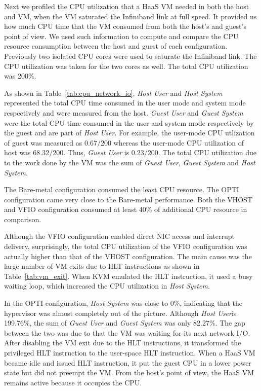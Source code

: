 Next we profiled the CPU utilization that a HaaS VM needed in
both the host and VM, when the VM saturated the Infiniband
link at full speed. It provided us how much CPU time that the
VM consumed from both the host's and guest's point of view. We
used such information to compute and compare the CPU resource
consumption between the host and guest of each configuration.
Previously two isolated CPU cores were used to saturate the
Infiniband link. The CPU utilization was taken for the two
cores as well. The total CPU utilization was 200\%.

As shown in Table~\ref{tab:cpu_network_io}, \emph{Host
User} and \emph{Host System} represented the total CPU time
consumed in the user mode and system mode respectively and
were measured from the host. \emph{Guest User} and \emph{Guest
System} were the total CPU time consumed in the user and
system mode respectively by the guest and are part of
\emph{Host User}. For example, the user-mode CPU utlization of
guest was measured as $0.67/200$ whereas the user-mode CPU
utilization of host was $68.32/200$. Thus, \emph{Guest User}
is $0.23/200$. The total CPU utilization due to the work done
by the VM was the sum of \emph{Guest User}, \emph{Guest
System} and \emph{Host System}.

The Bare-metal configuration consumed the least CPU resource.
The OPTI configuration came very close to the Bare-metal
performance. Both the VHOST and VFIO configuration consumed at
least 40\% of additional CPU resource in comparison.

Although the VFIO configuration enabled direct NIC access and
interrupt delivery, surprisingly, the total CPU utilization of
the VFIO configuration was actually higher than that of the
VHOST configuration. The main cause was the large number of VM
exits due to HLT instructions as shown in
Table~\ref{tab:vm_exit}. When KVM emulated the HLT
instruction, it used a busy waiting loop, which
increased the CPU utilization in \emph{Host System}.

In the OPTI configuration, \emph{Host System} was close to
0\%, indicating that the hypervisor was almost completely out
of the picture. Although \emph{Host User}is 199.76\%, the sum
of \emph{Guest User} and \emph{Guest System} was only 82.27\%.
The gap between the two was due to that the VM was waiting for
its next network I/O. After disabling the VM exit due to the
HLT instructions, it transformed the privileged HLT
instruction to the user-space HLT instruction. When a HaaS VM
became idle and issued HLT instruction, it put the guest CPU
in a lower power state but did not preempt the VM. From the
host's point of view, the HaaS VM remains active because it
occupies the CPU.



